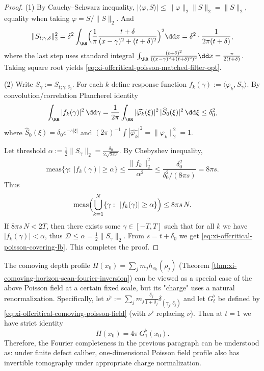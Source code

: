 \begin{proof}
(1) By Cauchy--Schwarz inequality,
\(
|\langle \varphi,S\rangle|\le \|\varphi\|_2\|S\|_2=\|S\|_2
\), equality when taking \(\varphi=S/\|S\|_2\). And
\[
\|S_{t;\gamma,\delta}\|_2^2
=\delta^2\int_{\RR}\Bigl(\frac{1}{\pi}\frac{t+\delta}{(x-\gamma)^2+(t+\delta)^2}\Bigr)^2\dd x
=\delta^2\cdot\frac{1}{2\pi(t+\delta)},
\]
where the last step uses standard integral \(\int_{\RR}\frac{(t+\delta)^2}{((x-\gamma)^2+(t+\delta)^2)^2}\dd x=\frac{\pi}{2(t+\delta)}\).
Taking square root yields \eqref{eq:xi-offcritical-poisson-matched-filter-opt}.
\par
(2) Write \(S_\gamma:=S_{t;\gamma,\delta_0}\).
For each \(k\) define response function \(f_k(\gamma):=\langle \varphi_k,S_\gamma\rangle\).
By convolution/correlation Plancherel identity
\[
\int_{\RR}|f_k(\gamma)|^2\,\dd\gamma
=\frac{1}{2\pi}\int_{\RR}|\widehat{\varphi_k}(\xi)|^2\,|\widehat S_0(\xi)|^2\,\dd\xi
\le \delta_0^2,
\]
where \(\widehat S_0(\xi)=\delta_0 e^{-s|\xi|}\) and \((2\pi)^{-1}\int|\widehat{\varphi_k}|^2=\|\varphi_k\|_2^2=1\).
\par
Let threshold \(\alpha:=\frac12\|S_\gamma\|_2=\frac{\delta_0}{2\sqrt{2\pi s}}\).
By Chebyshev inequality,
\[
\mathrm{meas}\{\gamma:\ |f_k(\gamma)|\ge \alpha\}
\le \frac{\|f_k\|_2^2}{\alpha^2}
\le \frac{\delta_0^2}{\delta_0^2/(8\pi s)}
=8\pi s.
\]
Thus
\[
\mathrm{meas}\Bigl(\bigcup_{k=1}^{N}\{\gamma:\ |f_k(\gamma)|\ge \alpha\}\Bigr)
\le 8\pi s\,N.
\]
If \(8\pi s\,N<2T\), then there exists some \(\gamma\in[-T,T]\) such that for all \(k\) we have \(|f_k(\gamma)|<\alpha\), thus \(\mathcal D\le \alpha=\frac12\|S_\gamma\|_2\).
From \(s=t+\delta_0\) we get \eqref{eq:xi-offcritical-poisson-covering-lb}. This completes the proof.
\end{proof}

\begin{remark}\label{rem:xi-poisson-field-vs-depth-profile}
The comoving depth profile \(H(x_0)=\sum_j m_j h_{x_0}(\rho_j)\) (Theorem \ref{thm:xi-comoving-horizon-scan-fourier-inversion}) can be viewed as a special case of the above Poisson field at a certain fixed scale, but its "charge" uses a natural renormalization.
Specifically, let
\(
\nu^{\flat}:=\sum_j m_j\frac{\delta_j}{1+\delta_j}\delta_{(\gamma_j,\delta_j)}
\)
and let \(G^{\flat}_t\) be defined by \eqref{eq:xi-offcritical-comoving-poisson-field} (with \(\nu^{\flat}\) replacing \(\nu\)).
Then at \(t=1\) we have strict identity
\[
H(x_0)=4\pi\,G^{\flat}_1(x_0).
\]
Therefore, the Fourier completeness in the previous paragraph can be understood as: under finite defect caliber, one-dimensional Poisson field profile also has invertible tomography under appropriate charge normalization.
\end{remark}

